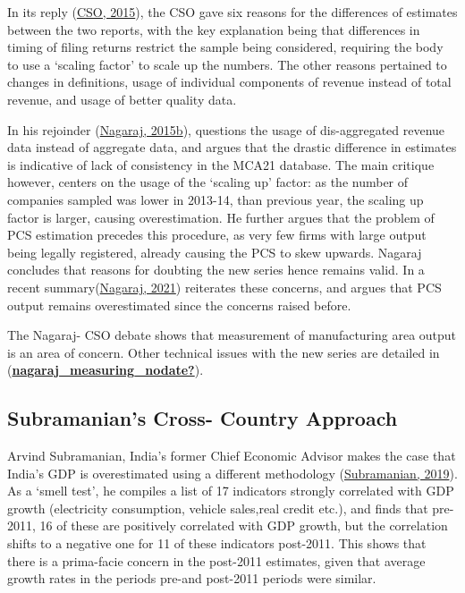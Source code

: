 \documentclass[12pt,nobind, a4paper]{reedthesis}
\begin{document}
 In its reply (\protect\hyperlink{ref-cso_no_2015}{CSO, 2015}), the CSO gave six reasons for the differences of estimates between the two reports, with the key explanation being that differences in timing of filing returns restrict the sample being considered, requiring the body to use a `scaling factor' to scale up the numbers. The other reasons pertained to changes in definitions, usage of individual components of revenue instead of total revenue, and usage of better quality data.
 \linebreak

 In his rejoinder (\protect\hyperlink{ref-nagaraj_seeds_2015}{Nagaraj, 2015b}), questions the usage of dis-aggregated revenue data instead of aggregate data, and argues that the drastic difference in estimates is indicative of lack of consistency in the MCA21 database. The main critique however, centers on the usage of the `scaling up' factor: as the number of companies sampled was lower in 2013-14, than previous year, the scaling up factor is larger, causing overestimation. He further argues that the problem of PCS estimation precedes this procedure, as very few firms with large output being legally registered, already causing the PCS to skew upwards. Nagaraj concludes that reasons for doubting the new series hence remains valid. In a recent summary(\protect\hyperlink{ref-nagaraj_revisiting_2021}{Nagaraj, 2021}) reiterates these concerns, and argues that PCS output remains overestimated since the concerns raised before.
 \linebreak

 The Nagaraj- CSO debate shows that measurement of manufacturing area output is an area of concern. Other technical issues with the new series are detailed in (\protect\hyperlink{ref-nagaraj_measuring_nodate}{\textbf{nagaraj\_measuring\_nodate?}}).

 \hypertarget{subramanians-cross--country-approach}{%
 \subsection{Subramanian's Cross- Country Approach}\label{subramanians-cross--country-approach}}

 Arvind Subramanian, India's former Chief Economic Advisor makes the case that India's GDP is overestimated using a different methodology (\protect\hyperlink{ref-subramanian_indias_2019}{Subramanian, 2019}). As a `smell test', he compiles a list of 17 indicators strongly correlated with GDP growth (electricity consumption, vehicle sales,real credit etc.), and finds that pre-2011, 16 of these are positively correlated with GDP growth, but the correlation shifts to a negative one for 11 of these indicators post-2011. This shows that there is a prima-facie concern in the post-2011 estimates, given that average growth rates in the periods pre-and post-2011 periods were similar.
 \linebreak
\end{document}
